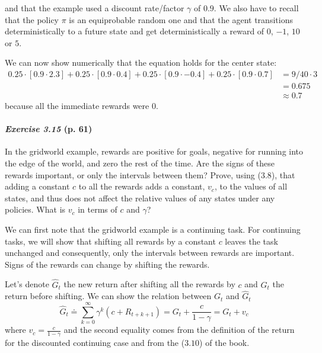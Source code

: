 \documentclass[10pt,a4paper]{article}
\begin{document}
and that the example used a discount rate/factor $\gamma$ of $0.9$. We also have to recall that the policy $\pi$ is an equiprobable random one and that the agent transitions deterministically to a future state and get deterministically a reward of $0$, $-1$, $10$ or $5$.

We can now show numerically that the equation holds for the center state:
\begin{equation}
\begin{split}
0.25 \cdot [0.9 \cdot 2.3] + 0.25 \cdot [0.9 \cdot 0.4] + 0.25 \cdot [0.9 \cdot -0.4] + 0.25 \cdot [0.9 \cdot 0.7] &= 9/40 \cdot 3\\
&= 0.675\\
&\approx 0.7
\end{split}
\end{equation}
because all the immediate rewards were $0$.

\paragraph{\textit{Exercise 3.15} (p. 61)} In the gridworld example, rewards are positive for goals, negative for running into the edge of the world, and zero the rest of the time. Are the signs of these rewards important, or only the intervals between them? Prove, using ($3.8$), that adding a
constant $c$ to all the rewards adds a constant, $v_c$, to the values of all states, and thus does not affect the relative values of any states under any policies. What is $v_c$ in terms of $c$ and $\gamma$?

\bigskip
We can first note that the gridworld example is a continuing task. For continuing tasks, we will show that shifting all rewards by a constant $c$ leaves the task unchanged and consequently, only the intervals between rewards are important. Signs of the rewards can change by shifting the rewards.

\bigskip
Let's denote $\hat{G}_t$ the new return after shifting all the rewards by $c$ and $G_t$ the return before shifting. We can show the relation between $G_t$ and $\hat{G}_t$
\begin{equation}\label{eq_continuing_shift_return}
\hat{G}_t \doteq \sum_{k=0}^\infty \gamma^k (c + R_{t+k+1}) = G_t + \frac{c}{1-\gamma} = G_t + v_c
\end{equation}
where $v_c = \frac{c}{1-\gamma}$ and the second equality comes from the definition of the return for the discounted continuing case and from the ($3.10$) of the book. 
\end{document}
